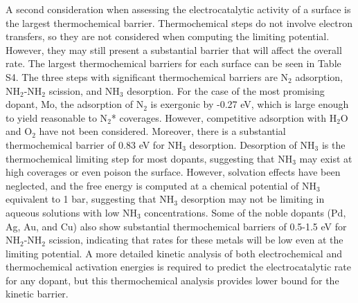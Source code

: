 A second consideration when assessing the electrocatalytic activity of a surface is the largest thermochemical barrier. Thermochemical steps do not involve electron transfers, so they are not considered when computing the limiting potential. However, they may still present a substantial barrier that will affect the overall rate. The largest thermochemical barriers for each surface can be seen in Table S4. The three steps with significant thermochemical barriers are N$_2$ adsorption, NH$_2$-NH$_2$ scission, and NH$_3$ desorption. For the case of the most promising dopant, Mo, 
the adsorption of N$_2$ is exergonic by -0.27 eV, which is large enough to yield reasonable to N$_2$* coverages. However, competitive adsorption with H$_2$O and O$_2$ have not been considered. Moreover, there is a substantial thermochemical barrier of 0.83 eV for NH$_3$ desorption. Desorption of NH$_3$ is the thermochemical limiting step for most dopants, suggesting that NH$_3$ may exist at high coverages or even poison the surface. However, solvation effects have been neglected, and the free energy is computed at a chemical potential of NH$_3$ equivalent to 1 bar, suggesting that NH$_3$ desorption may not be limiting in aqueous solutions with low NH$_3$ concentrations. Some of the noble dopants (Pd, Ag, Au, and Cu) also show substantial thermochemical barriers of 0.5-1.5 eV for NH$_2$-NH$_2$ scission, indicating that rates for these metals will be low even at the limiting potential. A more detailed kinetic analysis of both electrochemical and thermochemical activation energies is required to predict the electrocatalytic rate for any dopant, but this thermochemical analysis provides lower bound for the kinetic barrier.


